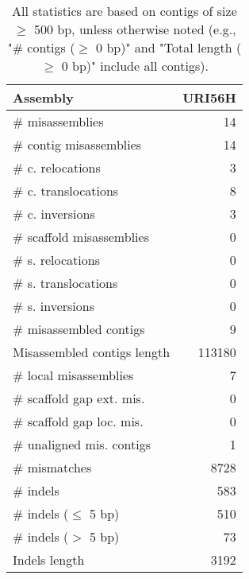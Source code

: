 \documentclass[12pt,a4paper]{article}
\begin{document}
\begin{table}[ht]
\begin{center}
\caption{All statistics are based on contigs of size $\geq$ 500 bp, unless otherwise noted (e.g., "\# contigs ($\geq$ 0 bp)" and "Total length ($\geq$ 0 bp)" include all contigs).}
\begin{tabular}{|l*{1}{|r}|}
\hline
Assembly & URI56H \\ \hline
\# misassemblies & 14 \\ \hline
\hspace{2mm}\# contig misassemblies & 14 \\ \hline
\hspace{5mm}\# c. relocations & 3 \\ \hline
\hspace{5mm}\# c. translocations & 8 \\ \hline
\hspace{5mm}\# c. inversions & 3 \\ \hline
\hspace{2mm}\# scaffold misassemblies & 0 \\ \hline
\hspace{5mm}\# s. relocations & 0 \\ \hline
\hspace{5mm}\# s. translocations & 0 \\ \hline
\hspace{5mm}\# s. inversions & 0 \\ \hline
\# misassembled contigs & 9 \\ \hline
Misassembled contigs length & 113180 \\ \hline
\# local misassemblies & 7 \\ \hline
\# scaffold gap ext. mis. & 0 \\ \hline
\# scaffold gap loc. mis. & 0 \\ \hline
\# unaligned mis. contigs & 1 \\ \hline
\# mismatches & 8728 \\ \hline
\# indels & 583 \\ \hline
\hspace{5mm}\# indels ($\leq$ 5 bp) & 510 \\ \hline
\hspace{5mm}\# indels ($>$ 5 bp) & 73 \\ \hline
Indels length & 3192 \\ \hline
\end{tabular}
\end{center}
\end{table}
\end{document}
